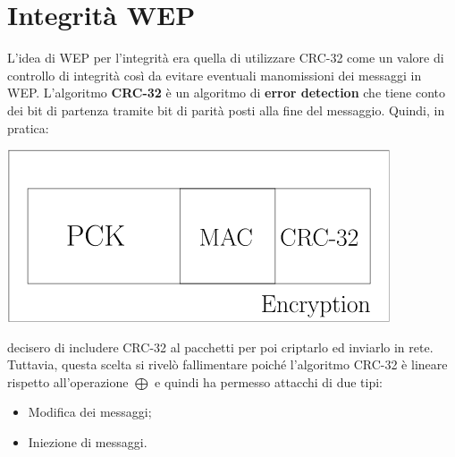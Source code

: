 \documentclass{book}
\theoremstyle{remark}
\begin{document}
\section{Integrità WEP}
L'idea di WEP per l'integrità era quella di utilizzare CRC-32 come un valore di controllo di integrità così da evitare eventuali manomissioni dei messaggi in WEP\@.
L'algoritmo \textbf{CRC-32} è un algoritmo di \textbf{error detection} che tiene conto dei bit di partenza tramite bit di parità posti alla fine del messaggio\@. Quindi, in pratica:
\begin{center}
	\includegraphics[scale=0.5]{CRCWEP.png}
\end{center}
decisero di includere CRC-32 al pacchetti per poi criptarlo ed inviarlo in rete\@. Tuttavia, questa scelta si rivelò fallimentare poiché l'algoritmo CRC-32 è lineare rispetto all'operazione \(\bigoplus \) e quindi ha permesso attacchi di due tipi:
\begin{itemize}
	\item Modifica dei messaggi;\@
	\item Iniezione di messaggi\@.
\end{itemize}
\end{document}
